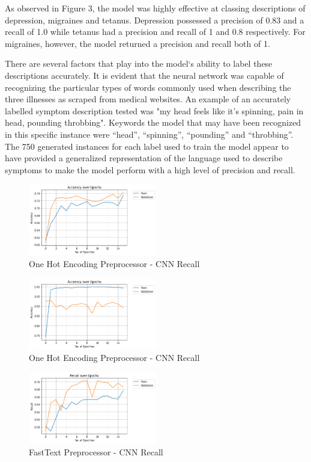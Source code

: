 \documentclass[12pt]{report}
\begin{document}
As observed in Figure 3, the model was highly effective at classing descriptions of
depression, migraines and tetanus. Depression possessed a precision of 0.83 and a
recall of 1.0 while tetanus had a precision and recall of 1 and 0.8 respectively.
For migraines, however, the model returned a precision and recall both of 1.

There are several factors that play into the model`s ability to label these descriptions
accurately. It is evident that the neural network was capable of recognizing the particular
types of words commonly used when describing the three illnesses as scraped from medical
websites. An example of an accurately labelled symptom description tested was "my head
feels like it's spinning, pain in head, pounding throbbing". Keywords the model that
may have been recognized in this specific instance were “head”, “spinning”, “pounding” and
“throbbing”. The 750 generated instances for each label used to train the model appear to
have provided a generalized representation of the language used to describe symptoms to make
the model perform with a high level of precision and recall.

\begin{figure}[h!]
	\includegraphics[width=0.5\textwidth]{accuracy-1.png}
	\caption{One Hot Encoding Preprocessor - CNN Recall}
	\label{fig:ohep-acc}
\end{figure}

\begin{figure}[h!]
	\includegraphics[width=0.5\textwidth]{accuracy.png}
	\caption{One Hot Encoding Preprocessor - CNN Recall}
	\label{fig:ohep-rec}
\end{figure}


\begin{figure}[h!]
	\includegraphics[width=0.5\textwidth]{recall-1.png}
	\caption{FastText Preprocessor - CNN Recall}
	\label{fig:ft-rec}
\end{figure}
\end{document}
